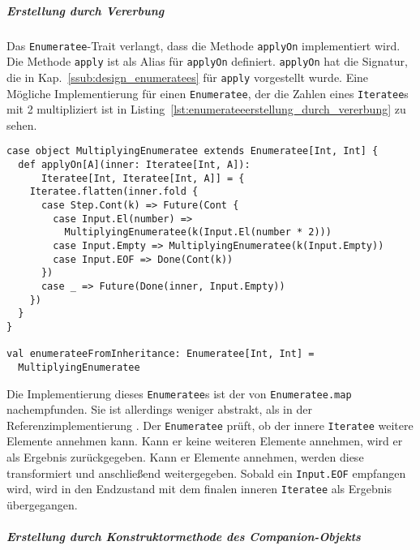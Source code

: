 \documentclass[draft=false
              ,paper=a4
              ,twoside=false
              ,fontsize=11pt
              ,headsepline
              ,BCOR10mm
              ,DIV11
              ]{scrbook}
\begin{document}
\subparagraph{Erstellung durch Vererbung} %
\label{subp:enumerateeerstellung_durch_vererbung}\mbox{} %

Das \lstinline|Enumeratee|-Trait verlangt, dass die Methode \lstinline|applyOn| implementiert wird.
Die Methode \lstinline|apply| ist als Alias für \lstinline|applyOn| definiert.
\lstinline|applyOn| hat die Signatur, die in Kap.~\ref{ssub:design_enumeratees} für \lstinline|apply| vorgestellt wurde.
Eine Mögliche Implementierung für einen \lstinline|Enumeratee|, der die Zahlen eines \lstinline|Iteratee|s mit 2 multipliziert ist in Listing~\ref{lst:enumerateeerstellung_durch_vererbung} zu sehen.

\begin{lstlisting}[caption=Erstellung eines Enumeratees durch Vererbung, label=lst:enumerateeerstellung_durch_vererbung]
case object MultiplyingEnumeratee extends Enumeratee[Int, Int] {
  def applyOn[A](inner: Iteratee[Int, A]):
      Iteratee[Int, Iteratee[Int, A]] = {
    Iteratee.flatten(inner.fold {
      case Step.Cont(k) => Future(Cont {
        case Input.El(number) =>
          MultiplyingEnumeratee(k(Input.El(number * 2)))
        case Input.Empty => MultiplyingEnumeratee(k(Input.Empty))
        case Input.EOF => Done(Cont(k))
      })
      case _ => Future(Done(inner, Input.Empty))
    })
  }
}

val enumerateeFromInheritance: Enumeratee[Int, Int] =
  MultiplyingEnumeratee
\end{lstlisting}

Die Implementierung dieses \lstinline|Enumeratee|s ist der von \lstinline|Enumeratee.map| nachempfunden.
Sie ist allerdings weniger abstrakt, als in der Referenzimplementierung \cite[vgl.][Zeile~268, 174, 81]{play_enumeratee_source_code}.
Der \lstinline|Enumeratee| prüft, ob der innere \lstinline|Iteratee| weitere Elemente annehmen kann.
Kann er keine weiteren Elemente annehmen, wird er als Ergebnis zurückgegeben.
Kann er Elemente annehmen, werden diese transformiert und anschließend weitergegeben.
Sobald ein \lstinline|Input.EOF| empfangen wird, wird in den Endzustand mit dem finalen inneren \lstinline|Iteratee| als Ergebnis übergegangen.


\subparagraph{Erstellung durch Konstruktormethode des Companion-Objekts} %
\label{subp:enumerateeerstellung_durch_konstruktormethode_des_companion_objekts}\mbox{} %
\end{document}

